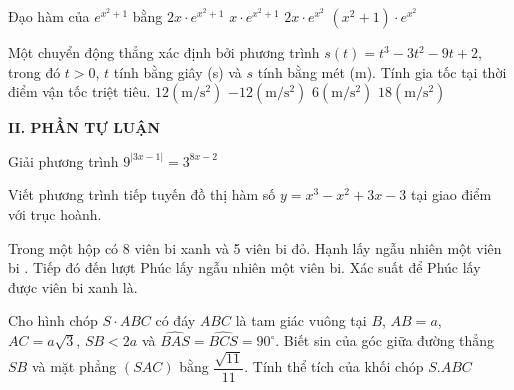 \begin{ex}
Đạo hàm của ${e^{x^2+1}}$ bằng
\choice
{$2x \cdot {e^{x^2+1}}$}
{$x \cdot {e^{x^2+1}}$}
{$2x \cdot {e^{x^2}}$}
{$\left(x^2+1\right) \cdot {e^{x^2}}$}
\end{ex}
\begin{ex}
Một chuyển động thẳng xác định bởi phương trình $s(t)=t^3-3t^2-9t+2$, trong đó $t>0$, $t$ tính bằng giây (s) và $s$ tính bằng mét (m). Tính gia tốc tại thời điểm vận tốc triệt tiêu.
\choice
{$12\mathrm{(m/s^2)}$}
{$-12\mathrm{(m/s^2)}$}
{$6\mathrm{(m/s^2)}$}
{$18\mathrm{(m/s^2)}$}
\end{ex}


\noindent\textbf{II. PHẦN TỰ LUẬN}
\begin{ex}
Giải phương trình ${9^{|3x-1|}}={3^{8x-2}}$
\end{ex}
\begin{ex}
Viết phương trình tiếp tuyến đồ thị hàm số $y=x^3-x^2+3x-3$ tại giao điểm với trục hoành.
\end{ex}
\begin{ex}
Trong một hộp có  8 viên bi xanh và  5 viên bi đỏ. Hạnh lấy ngẫu nhiên một viên bi . Tiếp đó đến lượt Phúc lấy ngẫu nhiên một viên bi. Xác suất để Phúc lấy được viên bi xanh là.
\end{ex}
\begin{ex}
Cho hình chóp $S \cdot ABC$ có đáy $ABC$ là tam giác vuông tại $B$, $AB=a$, $AC=a\sqrt{3}$, $SB<2a$ và $\widehat{BAS}=\widehat{BCS}=90^\circ $. Biết sin của góc giữa đường thẳng $SB$ và mặt phẳng $(SAC)$ bằng $\dfrac{\sqrt{11}}{11}$. Tính thể tích của khối chóp $S.ABC$
\end{ex}


